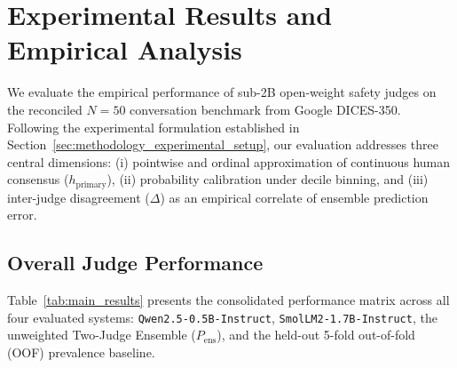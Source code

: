 \section{Experimental Results and Empirical Analysis}
\label{sec:results}

We evaluate the empirical performance of sub-2B open-weight safety judges on the reconciled $N=50$ conversation benchmark from Google DICES-350. Following the experimental formulation established in Section~\ref{sec:methodology_experimental_setup}, our evaluation addresses three central dimensions: (i) pointwise and ordinal approximation of continuous human consensus ($h_{\text{primary}}$), (ii) probability calibration under decile binning, and (iii) inter-judge disagreement ($\Delta$) as an empirical correlate of ensemble prediction error.

\subsection{Overall Judge Performance}
\label{subsec:overall_performance}

Table~\ref{tab:main_results} presents the consolidated performance matrix across all four evaluated systems: \texttt{Qwen2.5-0.5B-Instruct}, \texttt{SmolLM2-1.7B-Instruct}, the unweighted Two-Judge Ensemble ($P_{\text{ens}}$), and the held-out 5-fold out-of-fold (OOF) prevalence baseline.

